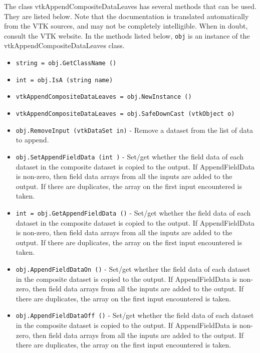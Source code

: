 The class vtkAppendCompositeDataLeaves has several methods that can be used.
  They are listed below.
Note that the documentation is translated automatically from the VTK sources,
and may not be completely intelligible.  When in doubt, consult the VTK website.
In the methods listed below, \verb|obj| is an instance of the vtkAppendCompositeDataLeaves class.
\begin{itemize}
\item  \verb|string = obj.GetClassName ()|

\item  \verb|int = obj.IsA (string name)|

\item  \verb|vtkAppendCompositeDataLeaves = obj.NewInstance ()|

\item  \verb|vtkAppendCompositeDataLeaves = obj.SafeDownCast (vtkObject o)|

\item  \verb|obj.RemoveInput (vtkDataSet in)| -  Remove a dataset from the list of data to append.

\item  \verb|obj.SetAppendFieldData (int )| -  Set/get whether the field data of each dataset in the composite dataset is copied to the output.
 If AppendFieldData is non-zero, then field data arrays from all the inputs are added
 to the output. If there are duplicates, the array on the first input encountered is taken.

\item  \verb|int = obj.GetAppendFieldData ()| -  Set/get whether the field data of each dataset in the composite dataset is copied to the output.
 If AppendFieldData is non-zero, then field data arrays from all the inputs are added
 to the output. If there are duplicates, the array on the first input encountered is taken.

\item  \verb|obj.AppendFieldDataOn ()| -  Set/get whether the field data of each dataset in the composite dataset is copied to the output.
 If AppendFieldData is non-zero, then field data arrays from all the inputs are added
 to the output. If there are duplicates, the array on the first input encountered is taken.

\item  \verb|obj.AppendFieldDataOff ()| -  Set/get whether the field data of each dataset in the composite dataset is copied to the output.
 If AppendFieldData is non-zero, then field data arrays from all the inputs are added
 to the output. If there are duplicates, the array on the first input encountered is taken.

\end{itemize}
